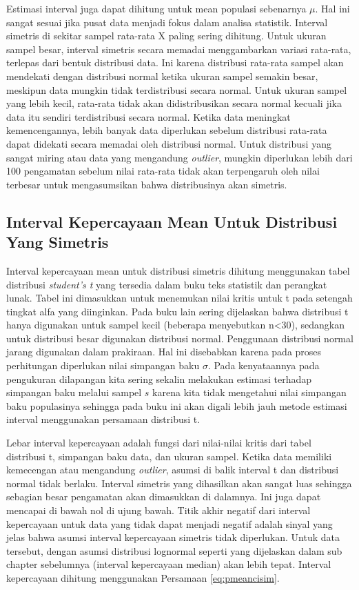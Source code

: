 \documentclass[]{book}
\begin{document}
Estimasi interval juga dapat dihitung untuk mean populasi sebenarnya
\(\mu\). Hal ini sangat sesuai jika pusat data menjadi fokus dalam
analisa statistik. Interval simetris di sekitar sampel rata-rata X
paling sering dihitung. Untuk ukuran sampel besar, interval simetris
secara memadai menggambarkan variasi rata-rata, terlepas dari bentuk
distribusi data. Ini karena distribusi rata-rata sampel akan mendekati
dengan distribusi normal ketika ukuran sampel semakin besar, meskipun
data mungkin tidak terdistribusi secara normal. Untuk ukuran sampel yang
lebih kecil, rata-rata tidak akan didistribusikan secara normal kecuali
jika data itu sendiri terdistribusi secara normal. Ketika data meningkat
kemencengannya, lebih banyak data diperlukan sebelum distribusi
rata-rata dapat didekati secara memadai oleh distribusi normal. Untuk
distribusi yang sangat miring atau data yang mengandung \emph{outlier},
mungkin diperlukan lebih dari 100 pengamatan sebelum nilai rata-rata
tidak akan terpengaruh oleh nilai terbesar untuk mengasumsikan bahwa
distribusinya akan simetris.

\subsection{Interval Kepercayaan Mean Untuk Distribusi Yang
Simetris}\label{interval-kepercayaan-mean-untuk-distribusi-yang-simetris}

Interval kepercayaan mean untuk distribusi simetris dihitung menggunakan
tabel distribusi \emph{student's t} yang tersedia dalam buku teks
statistik dan perangkat lunak. Tabel ini dimasukkan untuk menemukan
nilai kritis untuk t pada setengah tingkat alfa yang diinginkan. Pada
buku lain sering dijelaskan bahwa distribusi t hanya digunakan untuk
sampel kecil (beberapa menyebutkan n\textless{}30), sedangkan untuk
distribusi besar digunakan distribusi normal. Penggunaan distribusi
normal jarang digunakan dalam prakiraan. Hal ini disebabkan karena pada
proses perhitungan diperlukan nilai simpangan baku \(\sigma\). Pada
kenyataannya pada pengukuran dilapangan kita sering sekalin melakukan
estimasi terhadap simpangan baku melalui sampel \(s\) karena kita tidak
mengetahui nilai simpangan baku populasinya sehingga pada buku ini akan
digali lebih jauh metode estimasi interval menggunakan persamaan
distribusi t.

Lebar interval kepercayaan adalah fungsi dari nilai-nilai kritis dari
tabel distribusi t, simpangan baku data, dan ukuran sampel. Ketika data
memiliki kemecengan atau mengandung \emph{outlier}, asumsi di balik
interval t dan distribusi normal tidak berlaku. Interval simetris yang
dihasilkan akan sangat luas sehingga sebagian besar pengamatan akan
dimasukkan di dalamnya. Ini juga dapat mencapai di bawah nol di ujung
bawah. Titik akhir negatif dari interval kepercayaan untuk data yang
tidak dapat menjadi negatif adalah sinyal yang jelas bahwa asumsi
interval kepercayaan simetris tidak diperlukan. Untuk data tersebut,
dengan asumsi distribusi lognormal seperti yang dijelaskan dalam sub
chapter sebelumnya (interval kepercayaan median) akan lebih tepat.
Interval kepercayaan dihitung menggunakan Persamaan \eqref{eq:pmeancisim}.
\end{document}
